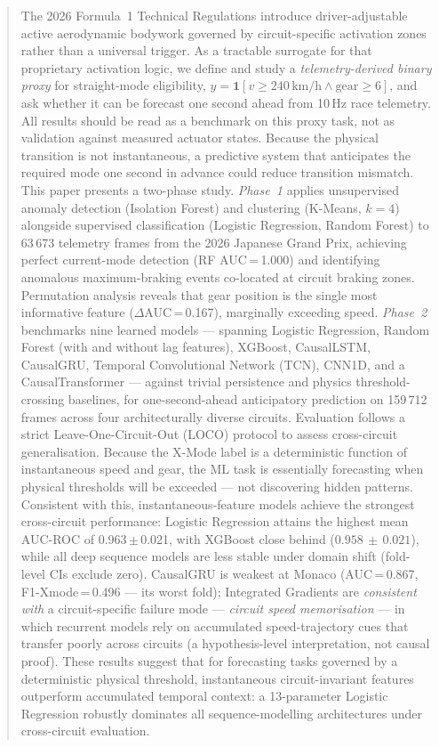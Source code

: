 \documentclass[conference,a4paper]{IEEEtran}
\begin{document}
\begin{abstract}
The 2026 Formula~1 Technical Regulations introduce driver-adjustable active aerodynamic
bodywork governed by circuit-specific activation zones rather than a universal trigger.
As a tractable surrogate for that proprietary activation logic, we define and study a
\emph{telemetry-derived binary proxy} for straight-mode eligibility,
$y = \mathbf{1}[v \geq 240\,\text{km/h} \wedge \text{gear} \geq 6]$, and ask whether it
can be forecast one second ahead from 10\,Hz race telemetry. All results should be read as
a benchmark on this proxy task, not as validation against measured actuator states.
Because the physical transition is not instantaneous, a predictive system that
anticipates the required mode one second in advance could reduce transition mismatch.
This paper presents a two-phase study.
\emph{Phase~1} applies unsupervised anomaly detection (Isolation Forest) and
clustering (K-Means, $k{=}4$) alongside supervised classification (Logistic Regression,
Random Forest) to 63\,673 telemetry frames from the 2026 Japanese Grand Prix,
achieving perfect current-mode detection (RF AUC\,=\,1.000) and identifying
anomalous maximum-braking events co-located at circuit braking zones.
Permutation analysis reveals that gear position is the single most informative feature
($\Delta$AUC\,=\,0.167), marginally exceeding speed.
\emph{Phase~2} benchmarks nine learned models — spanning Logistic Regression, Random
Forest (with and without lag features), XGBoost, CausalLSTM, CausalGRU, Temporal
Convolutional Network (TCN), CNN1D, and a CausalTransformer — against trivial persistence
and physics threshold-crossing baselines, for one-second-ahead anticipatory
prediction on 159\,712 frames across four architecturally diverse circuits.
Evaluation follows a strict Leave-One-Circuit-Out (LOCO) protocol to assess
cross-circuit generalisation.
Because the X-Mode label is a deterministic function of instantaneous speed and gear,
the ML task is essentially forecasting when physical thresholds will be exceeded
— not discovering hidden patterns. Consistent with this, instantaneous-feature models
achieve the strongest cross-circuit performance: Logistic Regression attains the highest
mean AUC-ROC of 0.963\,$\pm$\,0.021, with XGBoost close behind ($0.958\,\pm\,0.021$), while
all deep sequence models are less stable under domain shift (fold-level CIs exclude zero).
CausalGRU is weakest at Monaco (AUC\,=\,0.867, F1-Xmode\,=\,0.496 — its worst fold);
Integrated Gradients are \emph{consistent with} a circuit-specific failure mode —
\emph{circuit speed memorisation} — in which recurrent models rely on accumulated
speed-trajectory cues that transfer poorly across circuits (a hypothesis-level
interpretation, not causal proof).
These results suggest that for forecasting tasks governed by a deterministic
physical threshold, instantaneous circuit-invariant features outperform accumulated
temporal context: a 13-parameter Logistic Regression robustly dominates all
sequence-modelling architectures under cross-circuit evaluation.
\end{abstract}
\end{document}
